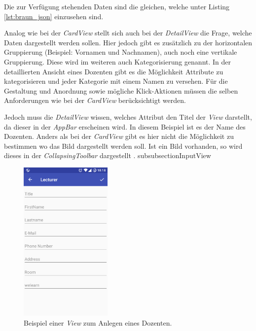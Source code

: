 Die zur Verfügung stehenden Daten sind die gleichen, welche unter Listing \ref{lst:braun_json} einzusehen sind.

Analog wie bei der \textit{CardView} stellt sich auch bei der \textit{DetailView} die Frage, welche Daten dargestellt werden sollen. Hier jedoch gibt es zusätzlich zu der horizontalen Gruppierung (Beispiel: Vornamen und Nachnamen), auch noch eine vertikale Gruppierung. Diese wird im weiteren auch Kategorisierung genannt. In der detaillierten Ansicht eines Dozenten gibt es die Möglichkeit Attribute zu kategorisieren und jeder Kategorie mit einem Namen zu versehen. Für die Gestaltung und Anordnung sowie mögliche Klick-Aktionen müssen die selben Anforderungen wie bei der \textit{CardView} berücksichtigt werden. 

Jedoch muss die \textit{DetailView} wissen, welches Attribut den Titel der \textit{View} darstellt, da dieser in der \textit{AppBar} erscheinen wird. In diesem Beispiel ist es der Name des Dozenten. Anders als bei der \textit{CardView} gibt es hier nicht die Möglichkeit zu bestimmen wo das Bild dargestellt werden soll. Ist ein Bild vorhanden, so wird dieses in der \textit{CollapsingToolbar} dargestellt \cite{collapsing}.
subsubsection{InputView}

\begin{figure}[H]
	\begin{center}
		\includegraphics[width=0.4\textwidth]{images/input.png}
		\caption{Beispiel einer \textit{View} zum Anlegen eines Dozenten.}
		\label{fig:input}
	\end{center}
\end{figure}

